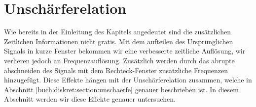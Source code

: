 %
%
%
%
\section{Unschärferelation
\label{sonogramm:section:teil1}}
Wie bereits in der Einleitung des Kapitels angedeutet sind die zusätzlichen
Zeitlichen Informationen nicht gratis. 
Mit dem aufteilen des Ursprünglichen Signals in kurze Fenster bekommen wir eine
verbesserte zeitliche Auflösung, wir verlieren jedoch an Frequenzauflösung.
Zusätzlich werden durch das abrupte abschneiden des Signals mit dem Rechteck-Fenster
zusätzliche Frequenzen hinzugefügt. 
Diese Effekte hängen mit der Unschärferelation zusammen, welche in Abschnitt
\ref{buch:diskret:section:unschaerfe} genauer beschrieben ist.
In diesem Abschnitt werden wir diese Effekte genauer untersuchen.

